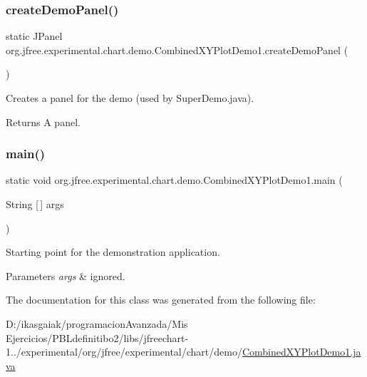 \subsubsection{\texorpdfstring{create\+Demo\+Panel()}{createDemoPanel()}}
{\footnotesize\ttfamily static J\+Panel org.\+jfree.\+experimental.\+chart.\+demo.\+Combined\+X\+Y\+Plot\+Demo1.\+create\+Demo\+Panel (\begin{DoxyParamCaption}{ }\end{DoxyParamCaption})\hspace{0.3cm}{\ttfamily [static]}}

Creates a panel for the demo (used by Super\+Demo.\+java).

\begin{DoxyReturn}{Returns}
A panel. 
\end{DoxyReturn}
\mbox{\label{classorg_1_1jfree_1_1experimental_1_1chart_1_1demo_1_1_combined_x_y_plot_demo1_ad50250db41e74082bd0c0556191cd92e}} 
\subsubsection{\texorpdfstring{main()}{main()}}
{\footnotesize\ttfamily static void org.\+jfree.\+experimental.\+chart.\+demo.\+Combined\+X\+Y\+Plot\+Demo1.\+main (\begin{DoxyParamCaption}\item[{String \mbox{[}$\,$\mbox{]}}]{args }\end{DoxyParamCaption})\hspace{0.3cm}{\ttfamily [static]}}

Starting point for the demonstration application.


\begin{DoxyParams}{Parameters}
{\em args} & ignored. \\
\hline
\end{DoxyParams}


The documentation for this class was generated from the following file\+:\begin{DoxyCompactItemize}
\item 
D\+:/ikasgaiak/programacion\+Avanzada/\+Mis Ejercicios/\+P\+B\+Ldefinitibo2/libs/jfreechart-\/1../experimental/org/jfree/experimental/chart/demo/\mbox{\hyperlink{_combined_x_y_plot_demo1_8java}{Combined\+X\+Y\+Plot\+Demo1.\+java}}\end{DoxyCompactItemize}
